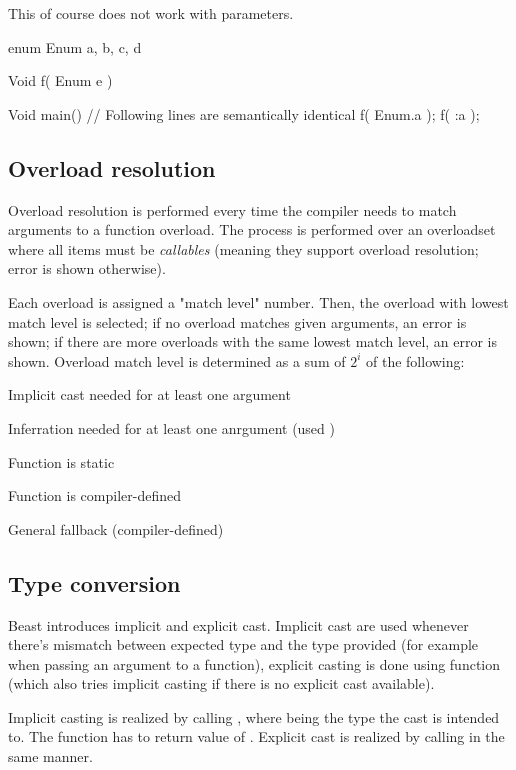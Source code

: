 This of course does not work with  parameters.

\begin{code}
enum Enum {
	a, b, c, d
}

Void f( Enum e ) {}

Void main() {
	// Following lines are semantically identical
	f( Enum.a );
	f( :a );	
}
\end{code}

\subsection{Overload resolution} \label{overloadResolution}
Overload resolution is performed every time the compiler needs to match arguments to a function overload. The process is performed over an overloadset where all items must be \textit{callables} (meaning they support overload resolution; error is shown otherwise).

Each overload is assigned a "match level" number. Then, the overload with lowest match level is selected; if no overload matches given arguments, an error is shown; if there are more overloads with the same lowest match level, an error is shown. Overload match level is determined as a sum of $2^i$ of the following:

\begin{compactenum}
	\item Implicit cast needed for at least one argument
	\item Inferration needed for at least one anrgument (used )
	\item Function is static
	\item Function is compiler-defined
	\item General fallback (compiler-defined)
\end{compactenum}

\subsection{Type conversion} \label{typeConversion}
Beast introduces implicit and explicit cast. Implicit cast are used whenever there's mismatch between expected type and the type provided (for example when passing an argument to a function), explicit casting is done using function  (which also tries implicit casting if there is no explicit cast available).

Implicit casting is realized by calling , where  being the type the cast is intended to. The function has to return value of . Explicit cast is realized by calling  in the same manner.

